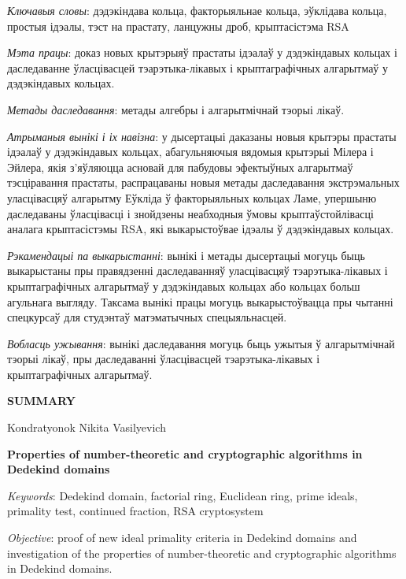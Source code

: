 \documentclass[_00_autoref.tex]{subfiles}
\begin{document}
\textit{Ключавыя словы}:
дэдэкіндава кольца, факторыяльнае кольца, эўклідава кольца, простыя ідэалы, тэст на прастату, ланцужны дроб, крыптасістэма RSA

\textit{Мэта працы}:
доказ новых крытэрыяў прастаты ідэалаў у дэдэкіндавых кольцах і даследаванне ўласцівасцей тэарэтыка-лікавых і крыптаграфічных алгарытмаў у дэдэкіндавых кольцах.

\textit{Метады даследавання}:
метады алгебры і алгарытмічнай тэорыі лікаў.

\textit{Атрыманыя вынікі і іх навізна}:
у дысертацыі даказаны новыя крытэры прастаты ідэалаў у дэдэкіндавых кольцах, абагульняючыя вядомыя крытэрыі Мілера і Эйлера, якія з'яўляюцца асновай для пабудовы эфектыўных алгарытмаў тэсціравання прастаты, распрацаваны новыя метады даследавання экстрэмальных уласцівасцяў алгарытму Еўкліда ў факторыяльных кольцах Ламе, упершыню даследаваны ўласцівасці і знойдзены неабходныя ўмовы крыптаўстойлівасці аналага крыптасістэмы RSA, які выкарыстоўвае ідэалы ў дэдэкіндавых кольцах.

\textit{Рэкамендацыі па выкарыстанні}:
вынікі і метады дысертацыі могуць быць выкарыстаны пры правядзенні даследаванняў уласцівасцяў тэарэтыка-лікавых і крыптаграфічных алгарытмаў у дэдэкіндавых кольцах або кольцах больш агульнага выгляду.
Таксама вынікі працы могуць выкарыстоўвацца пры чытанні спецкурсаў для студэнтаў матэматычных спецыяльнасцей.

\textit{Вобласць ужывання}:
вынікі даследавання могуць быць ужытыя ў алгарытмічнай тэорыі лікаў, пры даследаванні ўласцівасцей тэарэтыка-лікавых і крыптаграфічных алгарытмаў.

\newpage
\centerline{\textbf{SUMMARY}}

\vspace{-0.3ex}
\begin{center}
Kondratyonok Nikita Vasilyevich

\textbf{Properties of number-theoretic and cryptographic algorithms in Dedekind domains}
\end{center}
\vspace{-0.3ex}

\textit{Keywords}:
Dedekind domain, factorial ring, Euclidean ring, prime ideals, primality test, continued fraction, RSA cryptosystem

\textit{Objective}:
proof of new ideal primality criteria in Dedekind domains and investigation of the properties of number-theoretic and cryptographic algorithms in Dedekind domains.
\end{document}
